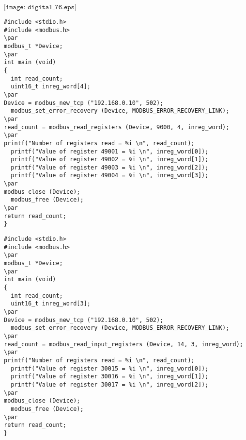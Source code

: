 \documentclass[12pt,a4paper,margin=2cm]{book}
\def\lthtmlcheckvsize{\ifdim\ht\sizebox<\vsize 
  \ifdim\wd\sizebox<\hsize\expandafter\hfill\fi \expandafter\vfill
  \else\expandafter\vss\fi}%
\begin{document}
{\newpage\clearpage
{}%
$\displaystyle \texttt{[image: digital\_76.eps]}$%
\lthtmlindisplaymathZ
\lthtmlcheckvsize\clearpage}

{\newpage\clearpage
{}%
\begin{lstlisting}
#include <stdio.h>
#include <modbus.h>
\par
modbus_t *Device;
\par
int main (void)
{
  int read_count;
  uint16_t inreg_word[4];
\par
Device = modbus_new_tcp ("192.168.0.10", 502);
  modbus_set_error_recovery (Device, MODBUS_ERROR_RECOVERY_LINK);
\par
read_count = modbus_read_registers (Device, 9000, 4, inreg_word);
\par
printf("Number of registers read = %i \n", read_count);
  printf("Value of register 49001 = %i \n", inreg_word[0]);
  printf("Value of register 49002 = %i \n", inreg_word[1]);
  printf("Value of register 49003 = %i \n", inreg_word[2]);
  printf("Value of register 49004 = %i \n", inreg_word[3]);
\par
modbus_close (Device);
  modbus_free (Device);
\par
return read_count;
}
\end{lstlisting}%
\lthtmlfigureZ
\lthtmlcheckvsize\clearpage}

{\newpage\clearpage
{}%
\begin{lstlisting}
#include <stdio.h>
#include <modbus.h>
\par
modbus_t *Device;
\par
int main (void)
{
  int read_count;
  uint16_t inreg_word[3];
\par
Device = modbus_new_tcp ("192.168.0.10", 502);
  modbus_set_error_recovery (Device, MODBUS_ERROR_RECOVERY_LINK);
\par
read_count = modbus_read_input_registers (Device, 14, 3, inreg_word);
\par
printf("Number of registers read = %i \n", read_count);
  printf("Value of register 30015 = %i \n", inreg_word[0]);
  printf("Value of register 30016 = %i \n", inreg_word[1]);
  printf("Value of register 30017 = %i \n", inreg_word[2]);
\par
modbus_close (Device);
  modbus_free (Device);
\par
return read_count;
}
\end{lstlisting}%
\lthtmlfigureZ
\lthtmlcheckvsize\clearpage}
\end{document}
